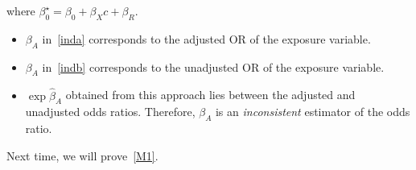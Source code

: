 \begin{enumerate}
\begin{itemize}
                        where $ \beta_0^\star =\beta_0+\beta_X c+\beta_R $.
                        \begin{itemize}
                              \item $ \beta_A $ in~\ref{inda} corresponds to the adjusted OR of the exposure variable.
                              \item $ \beta_A $ in~\ref{indb} corresponds to the unadjusted OR of the exposure variable.
                              \item $ \exp{\hat{\beta}_A} $ obtained from this approach lies between the adjusted and unadjusted
                                    odds ratios. Therefore, $ \beta_A $ is an \emph{inconsistent} estimator of the odds ratio.
                        \end{itemize}
            \end{itemize}
\end{enumerate}
Next time, we will prove~\ref{M1}.
